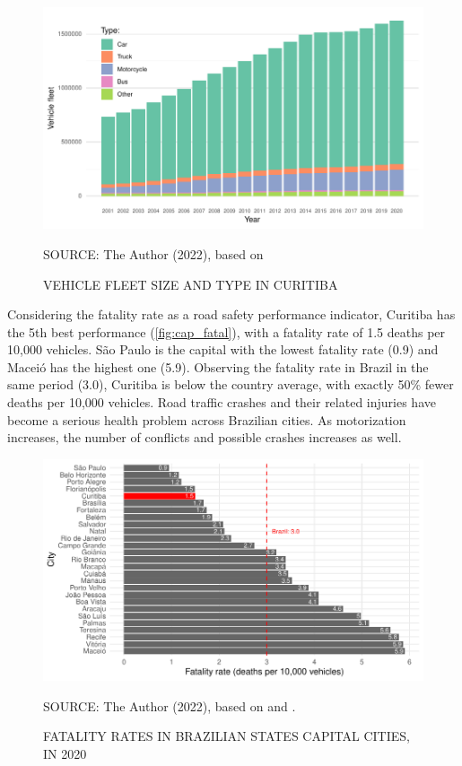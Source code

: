 \begin{figure}
    \centering\footnotesize
    \captionsetup{font=footnotesize}
    \caption{VEHICLE FLEET SIZE AND TYPE IN CURITIBA}
    \includegraphics{fig/cwb_fleet_type.pdf}
    \label{fig:cwb_fleet}
    \par SOURCE: The Author (2022), based on \textcite{DENATRAN2020}
\end{figure}

Considering the fatality rate as a road safety performance indicator, Curitiba has the 5th best performance (\autoref{fig:cap_fatal}), with a fatality rate of 1.5 deaths per 10,000 vehicles. São Paulo is the capital with the lowest fatality rate (0.9) and Maceió has the highest one (5.9). Observing the fatality rate in Brazil in the same period (3.0), Curitiba is below the country average, with exactly 50\% fewer deaths per 10,000 vehicles. Road traffic crashes and their related injuries have become a serious health problem across Brazilian cities. As motorization increases, the number of conflicts and possible crashes increases as well.

\begin{figure}[!htbp]
    \centering\footnotesize
    \captionsetup{font=footnotesize}
    \caption{FATALITY RATES IN BRAZILIAN STATES CAPITAL CITIES, IN 2020}
    \includegraphics{fig/cap_fatal.pdf}
    \label{fig:cap_fatal}
    \par SOURCE: The Author (2022), based on \textcite{MinistryofHealth2022} and \textcite{DENATRAN2020}.
\end{figure} 

